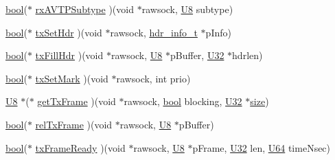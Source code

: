 \begin{DoxyCompactItemize}
\item 
\hyperlink{avb__gptp_8h_af6a258d8f3ee5206d682d799316314b1}{bool}($\ast$ \hyperlink{structrawsock__cb__t_a0b3fe73f957260501eec27c9b0fb74ae}{rx\+A\+V\+T\+P\+Subtype} )(void $\ast$rawsock, \hyperlink{openavb__types__base__pub_8h_aa63ef7b996d5487ce35a5a66601f3e73}{U8} subtype)
\item 
\hyperlink{avb__gptp_8h_af6a258d8f3ee5206d682d799316314b1}{bool}($\ast$ \hyperlink{structrawsock__cb__t_ab875aa95ffb8d23ba35bd17d44e0bbb0}{tx\+Set\+Hdr} )(void $\ast$rawsock, \hyperlink{structhdr__info__t}{hdr\+\_\+info\+\_\+t} $\ast$p\+Info)
\item 
\hyperlink{avb__gptp_8h_af6a258d8f3ee5206d682d799316314b1}{bool}($\ast$ \hyperlink{structrawsock__cb__t_a2e7da852d3fab19f9b408b612b84e1bb}{tx\+Fill\+Hdr} )(void $\ast$rawsock, \hyperlink{openavb__types__base__pub_8h_aa63ef7b996d5487ce35a5a66601f3e73}{U8} $\ast$p\+Buffer, \hyperlink{openavb__types__base__pub_8h_a696390429f2f3b644bde8d0322a24124}{U32} $\ast$hdrlen)
\item 
\hyperlink{avb__gptp_8h_af6a258d8f3ee5206d682d799316314b1}{bool}($\ast$ \hyperlink{structrawsock__cb__t_a926003e5137976663821b27ace9c3dbf}{tx\+Set\+Mark} )(void $\ast$rawsock, int prio)
\item 
\hyperlink{openavb__types__base__pub_8h_aa63ef7b996d5487ce35a5a66601f3e73}{U8} $\ast$($\ast$ \hyperlink{structrawsock__cb__t_abac4c30aae337d681176b220b37237fc}{get\+Tx\+Frame} )(void $\ast$rawsock, \hyperlink{avb__gptp_8h_af6a258d8f3ee5206d682d799316314b1}{bool} blocking, \hyperlink{openavb__types__base__pub_8h_a696390429f2f3b644bde8d0322a24124}{U32} $\ast$\hyperlink{gst__avb__playbin_8c_a439227feff9d7f55384e8780cfc2eb82}{size})
\item 
\hyperlink{avb__gptp_8h_af6a258d8f3ee5206d682d799316314b1}{bool}($\ast$ \hyperlink{structrawsock__cb__t_a271ab89bbfda02e12adfcdc727c2d5e2}{rel\+Tx\+Frame} )(void $\ast$rawsock, \hyperlink{openavb__types__base__pub_8h_aa63ef7b996d5487ce35a5a66601f3e73}{U8} $\ast$p\+Buffer)
\item 
\hyperlink{avb__gptp_8h_af6a258d8f3ee5206d682d799316314b1}{bool}($\ast$ \hyperlink{structrawsock__cb__t_ae06401a7fdbf21f6bfd7fd65d8e760d0}{tx\+Frame\+Ready} )(void $\ast$rawsock, \hyperlink{openavb__types__base__pub_8h_aa63ef7b996d5487ce35a5a66601f3e73}{U8} $\ast$p\+Frame, \hyperlink{openavb__types__base__pub_8h_a696390429f2f3b644bde8d0322a24124}{U32} len, \hyperlink{openavb__types__base__pub_8h_a25809e0734a149248fcf5831efa4e33d}{U64} time\+Nsec)
\item 

\end{DoxyCompactItemize}
